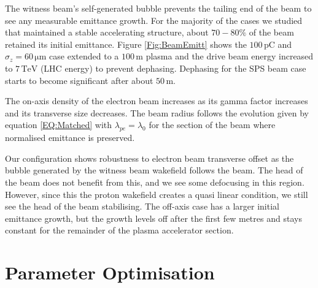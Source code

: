 \documentclass[aps,prstab,reprint,amsmath,amssymb,groupedaddress]{revtex4-1}
\newcommand{\unit}[1]{\,\mathrm{#1}}
\begin{document}

The witness beam's self-generated bubble prevents the tailing end of the beam to see any measurable emittance growth.
For the majority of the cases we studied that maintained a stable accelerating structure, about $70-80\%$ of the beam
retained its initial emittance. Figure \ref{Fig:BeamEmitt} shows the $100\unit{pC}$ and $\sigma_{z} = 60\unit{\mu m}$
case extended to a $100\unit{m}$ plasma and the drive beam energy increased to $7\unit{TeV}$ (LHC energy) to prevent
dephasing. Dephasing for the SPS beam case starts to become significant after about $50\unit{m}$.

The on-axis density of the electron beam increases as its gamma factor increases and its transverse size decreases. The
beam radius follows the evolution given by equation \ref{EQ:Matched} with $\lambda_{pe} = \lambda_{0}$ for the section
of the beam where normalised emittance is preserved.



Our configuration shows robustness to electron beam transverse offset as the bubble generated by the witness beam
wakefield follows the beam. The head of the beam does not benefit from this, and we see some defocusing in this region.
However, since this the proton wakefield creates a quasi linear condition, we still see the head of the beam
stabilising. The off-axis case has a larger initial emittance growth, but the growth levels off after the first few
metres and stays constant for the remainder of the plasma accelerator section.





\section[\label{S:PO}]{Parameter Optimisation}
\end{document}
